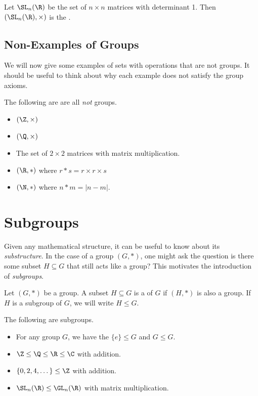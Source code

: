 \documentclass[a4]{scrreprt}
\newcommand{\newsection}{\section}
\begin{document}
\begin{example}
	Let $\SL_n(\R)$ be the set of $n \times n$ matrices with determinant 1. Then $(\SL_n(\R), \times)$ is the .
\end{example}

\subsection*{Non-Examples of Groups}

We will now give some examples of sets with operations that are not groups. It should be useful to think about why each example does not satisfy the group axioms.

\begin{example}
	The following are are all \emph{not} groups.
	\begin{itemize}
		\item $(\Z, \times)$
		\item $(\Q, \times)$
		\item The set of $2\times 2$ matrices with matrix multiplication.
		\item $(\R, *)$ where $r  * s = r\times r \times s$
		\item $(\N, *)$ where $n * m = |n - m|$.
	\end{itemize}
\end{example}

\newsection{Subgroups}

Given any mathematical structure, it can be useful to know about its \emph{substructure}. In the case of a group $(G, *)$, one might ask the question is there some subset $H \subseteq G$ that still acts like a group? This motivates the introduction of \emph{subgroups}.

\begin{definition}[Subgroups]
	Let $(G, *)$ be a group. A subset $H \subseteq G$ is a  of $G$ if $(H, *)$ is also a group. If $H$ is a subgroup of $G$, we will write $H \leq G$.
\end{definition}

\begin{example}
	The following are subgroups.
	\begin{itemize}
		\item For any group $G$, we have the  $\{ e \} \leq G$ and $G \leq G$.
		\item $\Z \leq \Q \leq \R \leq \C$ with addition.
		\item $\{ 0, 2, 4, \dots \} \leq \Z$ with addition.
		\item $\SL_n(\R) \leq \GL_n(\R)$ with matrix multiplication.
	\end{itemize}
\end{example}
\end{document}
